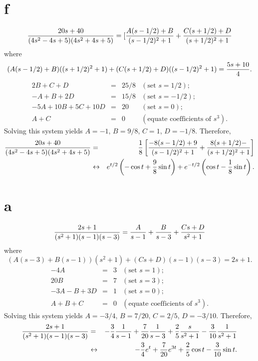 \documentclass[dvips]{book}
\renewcommand{\exer}[1]{\par\medskip\;\noindent{\color{red}\bf #1.}}
\numberwithin{example}{section}
\numberwithin{equation}{section}
\numberwithin{theorem}{section}
\numberwithin{table}{section}
\numberwithin{figure}{section}
\begin{document}
\part{f}
$$
{20s+40\over(4s^2-4s+5)(4s^2+4s+5)}
=[{A(s-1/2)+B\over(s-1/2)^2+1}+
{C(s+1/2)+D\over(s+1/2)^2+1}
$$
where
$$
(A(s-1/2)+B)((s+1/2)^2+1)+(C(s+1/2)+D)((s-1/2)^2+1)={5s+10\over4}.
$$
$$
\begin{array}{rcrl}
2B+C+D&=&25/8&(\mbox{set }s=1/2);\\
-A+B+2D&=&15/8& (\mbox{set }s=-1/2);\\
-5A+10B+5C+10D&=&20&(\mbox{set }s=0);\\
A+C&=&0&(\mbox{equate coefficients of }s^3).
\end{array}
$$
Solving this system yields $A=-1$, $B=9/8$,
$C=1$, $D=-1/8$. Therefore,
\begin{eqnarray*}
{20s+40\over(4s^2-4s+5)(4s^2+4s+5)}
&=&
{1\over8}\left[{-8(s-1/2)+9\over(s-1/2)^2+1}+{8(s+1/2)
-\over(s+1/2)^2+1}\right]
\\&\leftrightarrow&
e^{t/2}\left(-\cos t+{9\over8}\sin
t\right)+e^{-t/2}\left(\cos t-{1\over8}\sin t\right).
\end{eqnarray*}


\exer{8.2.8}
\part{a}
$$
{2s+1\over(s^2+1)(s-1)(s-3)}
={A\over s-1}+{B\over s-3}+{Cs+D\over s^2+1}
$$
where
$$
(A(s-3)+B(s-1))(s^2+1)+(Cs+D)(s-1)(s-3)=2s+1.
$$
$$
\begin{array}{rcrl}
-4A&=&3&(\mbox{set }s=1);\\
20B&=&7& (\mbox{set }s=3);\\
-3A-B+3D&=&1& (\mbox{set }s=0);\\
A+B+C&=&0&(\mbox{equate coefficients of }s^3).
\end{array}
$$
Solving this system yields $A=-3/4$, $B=7/20$,
$C=2/5$, $D=-3/10$. Therefore,
\begin{eqnarray*}
{2s+1\over(s^2+1)(s-1)(s-3)}
&=&
-{3\over4}{1\over s-1}+{7\over20}{1\over s-3}+{2\over5}{s\over
s^2+1}-{3\over10}{1\over s^2+1}
\\&\leftrightarrow&
-{3\over4}e^t+{7\over20}e^{3t}+{2\over5}\cos t-{3\over 10}\sin t.
\end{eqnarray*}
\end{document}
